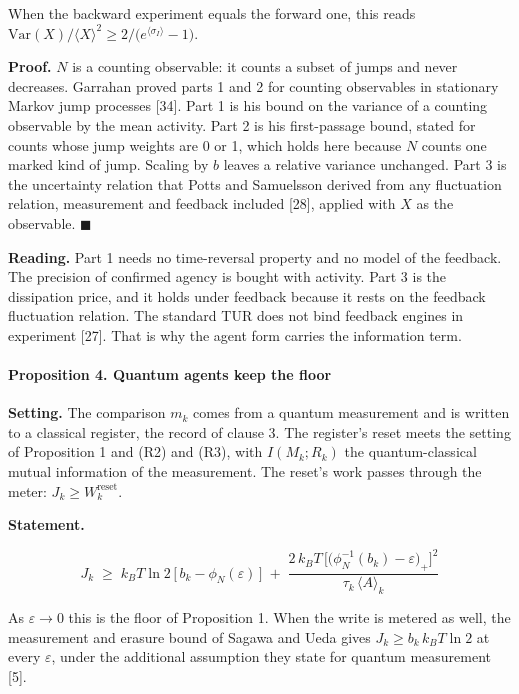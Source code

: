 \documentclass[
  10pt,
]{article}
\begin{document}
When the backward experiment equals the forward one, this reads
\(\mathrm{Var}(X)/\langle X\rangle^2 \ge 2/\big(e^{\langle\sigma_I\rangle} - 1\big)\).

\textbf{Proof.} \(N\) is a counting observable: it counts a subset of
jumps and never decreases. Garrahan proved parts 1 and 2 for counting
observables in stationary Markov jump processes {[}34{]}. Part 1 is his
bound on the variance of a counting observable by the mean activity.
Part 2 is his first-passage bound, stated for counts whose jump weights
are 0 or 1, which holds here because \(N\) counts one marked kind of
jump. Scaling by \(b\) leaves a relative variance unchanged. Part 3 is
the uncertainty relation that Potts and Samuelsson derived from any
fluctuation relation, measurement and feedback included {[}28{]},
applied with \(X\) as the observable. \(\blacksquare\)

\textbf{Reading.} Part 1 needs no time-reversal property and no model of
the feedback. The precision of confirmed agency is bought with activity.
Part 3 is the dissipation price, and it holds under feedback because it
rests on the feedback fluctuation relation. The standard TUR does not
bind feedback engines in experiment {[}27{]}. That is why the agent form
carries the information term.

\paragraph{Proposition 4. Quantum agents keep the
floor}\label{proposition-4.-quantum-agents-keep-the-floor}

\textbf{Setting.} The comparison \(m_k\) comes from a quantum
measurement and is written to a classical register, the record of clause
3. The register's reset meets the setting of Proposition 1 and (R2) and
(R3), with \(I(M_k;R_k)\) the quantum-classical mutual information of
the measurement. The reset's work passes through the meter:
\(J_k \ge W_k^{\mathrm{reset}}\).

\textbf{Statement.}

\[J_k \;\ge\; k_B T\ln 2\,\big[\,b_k - \phi_N(\varepsilon)\,\big] \;+\; \frac{2\, k_B T\, \big[\big(\phi_N^{-1}(b_k) - \varepsilon\big)_+\big]^2}{\tau_k\, \langle A\rangle_k}\]

As \(\varepsilon \to 0\) this is the floor of Proposition 1. When the
write is metered as well, the measurement and erasure bound of Sagawa
and Ueda gives \(J_k \ge b_k\, k_B T\ln 2\) at every \(\varepsilon\),
under the additional assumption they state for quantum measurement
{[}5{]}.
\end{document}
